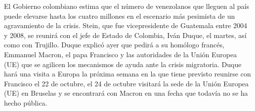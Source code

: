 \documentclass{article}%
\begin{document}
\newline%
%
El Gobierno colombiano estima que el número de venezolanos que lleguen al país puede elevarse hasta los cuatro millones en el escenario más pesimista de un agravamiento de la crisis.%
\newline%
%
Stein, que fue vicepresidente de Guatemala entre 2004 y 2008, se reunirá con el jefe de Estado de Colombia, Iván Duque, el martes, así como con Trujillo.%
\newline%
%
Duque explicó ayer que pedirá a su homólogo francés, Emmanuel Macron, el papa Francisco y las autoridades de la Unión Europea (UE) que se agilicen los mecanismos de ayuda ante la crisis migratoria.%
\newline%
%
Duque hará una visita a Europa la próxima semana en la que tiene previsto reunirse con Francisco el 22 de octubre, el 24 de octubre visitará la sede de la Unión Europea (UE) en Bruselas y se encontrará con Macron en una fecha que todavía no se ha hecho pública.%
\newline%
%
\end{document}
